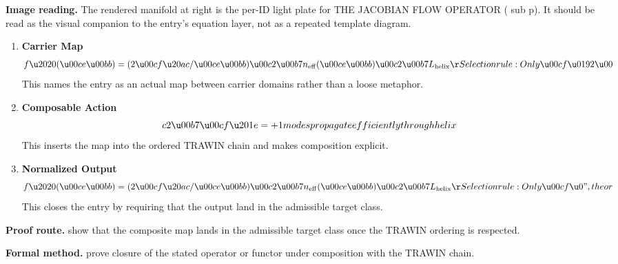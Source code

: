 \begin{samepage}
\noindent\begin{minipage}[t]{0.45\linewidth}
\vspace{0pt}
\raggedright
\scriptsize\textbf{Image reading.} The rendered manifold at right is the per-ID light plate for THE JACOBIAN FLOW OPERATOR (  sub p). It should be read as the visual companion to the entry's equation layer, not as a repeated template diagram.\par
\end{minipage}\hfill
\begin{minipage}[t]{0.53\linewidth}
\vspace*{-0.10in}
\raggedright
{}
\end{minipage}
\end{samepage}

\clearpage


\begin{enumerate}[leftmargin=1.6em,itemsep=9pt,topsep=6pt]
\item \textbf{Carrier Map}
\[
f\u2020(\u00ce\u00bb) = (2\u00cf\u20ac/\u00ce\u00bb)\u00c2\u00b7n_{\mathrm{eff}}(\u00ce\u00bb)\u00c2\u00b7L_{\mathrm{helix}}\r Selection rule: Only \u00cf\u0192\u00
\]
This names the entry as an actual map between carrier domains rather than a loose metaphor.

\item \textbf{Composable Action}
\[
c2\u00b7\u00cf\u201e = +1 modes propagate efficiently through helix
\]
This inserts the map into the ordered TRAWIN chain and makes composition explicit.

\item \textbf{Normalized Output}
\[
f\u2020(\u00ce\u00bb) = (2\u00cf\u20ac/\u00ce\u00bb)\u00c2\u00b7n_{\mathrm{eff}}(\u00ce\u00bb)\u00c2\u00b7L_{\mathrm{helix}}\r Selection rule: Only \u00cf\u0",theor
\]
This closes the entry by requiring that the output land in the admissible target class.
\end{enumerate}

\textbf{Proof route.} show that the composite map lands in the admissible target class once the TRAWIN ordering is respected.

\textbf{Formal method.} prove closure of the stated operator or functor under composition with the TRAWIN chain.

